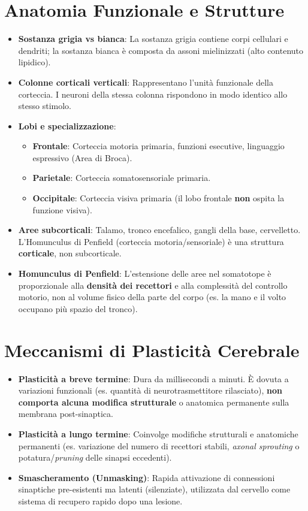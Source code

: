 \documentclass[10pt, letterpaper]{report}
\begin{document}
\section{Anatomia Funzionale e Strutture}
\begin{itemize}
    \item \textbf{Sostanza grigia vs bianca}: La sostanza grigia contiene corpi cellulari e dendriti; la sostanza bianca è composta da assoni mielinizzati (alto contenuto lipidico).
    \item \textbf{Colonne corticali verticali}: Rappresentano l'unità funzionale della corteccia. I neuroni della stessa colonna rispondono in modo identico allo stesso stimolo.
    \item \textbf{Lobi e specializzazione}:
    \begin{itemize}
        \item \textbf{Frontale}: Corteccia motoria primaria, funzioni esecutive, linguaggio espressivo (Area di Broca).
        \item \textbf{Parietale}: Corteccia somatosensoriale primaria.
        \item \textbf{Occipitale}: Corteccia visiva primaria (il lobo frontale \textbf{non} ospita la funzione visiva).
    \end{itemize}
    \item \textbf{Aree subcorticali}: Talamo, tronco encefalico, gangli della base, cervelletto. L'Homunculus di Penfield (corteccia motoria/sensoriale) è una struttura \textbf{corticale}, non subcorticale.
    \item \textbf{Homunculus di Penfield}: L'estensione delle aree nel somatotope è proporzionale alla \textbf{densità dei recettori} e alla complessità del controllo motorio, non al volume fisico della parte del corpo (es. la mano e il volto occupano più spazio del tronco).
\end{itemize}

\section{Meccanismi di Plasticità Cerebrale}
\begin{itemize}
    \item \textbf{Plasticità a breve termine}: Dura da millisecondi a minuti. È dovuta a variazioni funzionali (es. quantità di neurotrasmettitore rilasciato), \textbf{non comporta alcuna modifica strutturale} o anatomica permanente sulla membrana post-sinaptica.
    \item \textbf{Plasticità a lungo termine}: Coinvolge modifiche strutturali e anatomiche permanenti (es. variazione del numero di recettori stabili, \emph{axonal sprouting} o potatura/\emph{pruning} delle sinapsi eccedenti).
    \item \textbf{Smascheramento (Unmasking)}: Rapida attivazione di connessioni sinaptiche pre-esistenti ma latenti (silenziate), utilizzata dal cervello come sistema di recupero rapido dopo una lesione.
\end{itemize}
\end{document}

